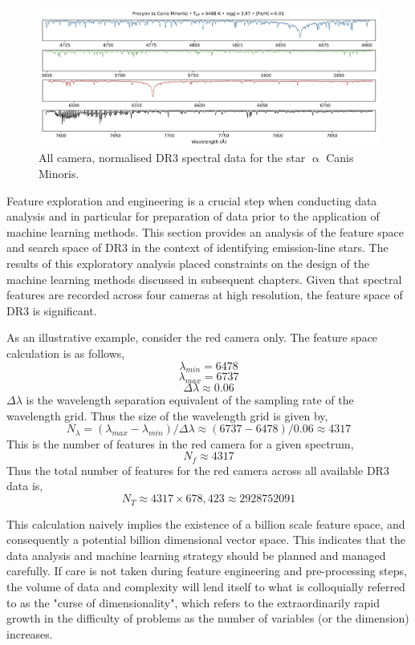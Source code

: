 \begin{figure}[!htb]
\centering
\includegraphics[scale=.25]{figures/galah cameras.jpeg}
\caption{All camera, normalised DR3 spectral data for the star $\upalpha$ Canis Minoris.}
\end{figure}

Feature exploration and engineering is a crucial step when conducting data analysis and in particular for preparation of data prior to the application of machine learning methods. This section provides an analysis of the feature space and search space of DR3 in the context of identifying emission-line stars. The results of this exploratory analysis placed constraints on the design of the machine learning methods discussed in subsequent chapters. Given that spectral features are recorded across four cameras at high resolution, the feature space of DR3 is significant. 

As an illustrative example, consider the red camera only. The feature space calculation is as follows,
\[\lambda_{min} = 6478\]
\[\lambda_{max} = 6737\]
\[\Delta\lambda \approx 0.06\]
$\Delta\lambda$ is the wavelength separation equivalent of the sampling rate of the wavelength grid. Thus the size of the wavelength grid is given by, \[N_{\lambda} = (\lambda_{max}-\lambda_{min})/\Delta\lambda \approx (6737-6478)/0.06 \approx 4317\]
This is the number of features in the red camera for a given spectrum, \[N_{f} \approx 4317\]
Thus the total number of features for the red camera across all available DR3 data is, \[N_{T} \approx 4317\times678,423 \approx \num[round-precision=2,round-mode=figures,
     scientific-notation=true]{2928752091}\]

This calculation naively implies the existence of a billion scale feature space, and consequently a potential billion dimensional vector space. This indicates that the data analysis and machine learning strategy should be planned and managed carefully. If care is not taken during feature engineering and pre-processing steps, the volume of data and complexity will lend itself to what is colloquially referred to as the "curse of dimensionality", which refers to the extraordinarily rapid growth in the difficulty of problems as the number of variables (or the dimension) increases\cite{kuo2005lifting}.

